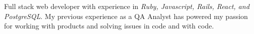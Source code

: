 \vspace{-1.0mm}

\begin{cvparagraph}

Full stack web developer with experience in \textit{Ruby, Javascript, Rails, React, and PostgreSQL}. My previous experience as a QA Analyst has powered my passion for working with products and solving issues in code and with code.\end{cvparagraph}
